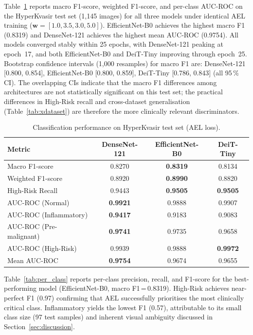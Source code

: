 \documentclass[11pt,a4paper]{article}
\begin{document}
Table~\ref{tab:main_perf} reports macro F1-score, weighted F1-score, and
per-class AUC-ROC on the HyperKvasir test set (1,145 images) for all three
models under identical AEL training ($\mathbf{w}=[1.0,3.5,3.0,5.0]$).
EfficientNet-B0 achieves the highest macro F1 (0.8319) and DenseNet-121
achieves the highest mean AUC-ROC (0.9754). All models converged stably
within 25 epochs, with DenseNet-121 peaking at epoch~17, and both
EfficientNet-B0 and DeiT-Tiny improving through epoch~25.
Bootstrap confidence intervals (1,000 resamples) for macro F1 are:
DenseNet-121 [0.800, 0.854], EfficientNet-B0 [0.800, 0.859],
DeiT-Tiny [0.786, 0.843] (all 95\,\% CI). The overlapping CIs indicate
that the macro F1 differences among architectures are not statistically
significant on this test set; the practical differences in High-Risk recall
and cross-dataset generalisation (Table~\ref{tab:xdataset}) are therefore
the more clinically relevant discriminators.

\begin{table}[H]
\centering
\caption{Classification performance on HyperKvasir test set (AEL loss).}
\label{tab:main_perf}
\begin{tabular}{lccc}
\toprule
\textbf{Metric} & \textbf{DenseNet-121} & \textbf{EfficientNet-B0} &
\textbf{DeiT-Tiny}\\
\midrule
Macro F1-score          & 0.8270        & \textbf{0.8319} & 0.8134\\
Weighted F1-score       & 0.8920        & \textbf{0.8990} & 0.8820\\
High-Risk Recall        & 0.9443        & \textbf{0.9505} & \textbf{0.9505}\\
AUC-ROC (Normal)        & \textbf{0.9921} & 0.9888        & 0.9907\\
AUC-ROC (Inflammatory)  & \textbf{0.9417} & 0.9183        & 0.9083\\
AUC-ROC (Pre-malignant) & \textbf{0.9741} & 0.9735        & 0.9658\\
AUC-ROC (High-Risk)     & 0.9939        & 0.9888        & \textbf{0.9972}\\
Mean AUC-ROC            & \textbf{0.9754} & 0.9674        & 0.9655\\
\bottomrule
\end{tabular}
\end{table}

Table~\ref{tab:per_class} reports per-class precision, recall, and F1-score
for the best-performing model (EfficientNet-B0, macro F1\,=\,0.8319).
High-Risk achieves near-perfect F1 (0.97) confirming that AEL successfully
prioritises the most clinically critical class. Inflammatory yields the
lowest F1 (0.57), attributable to its small class size (97 test samples)
and inherent visual ambiguity discussed in Section~\ref{sec:discussion}.
\end{document}
